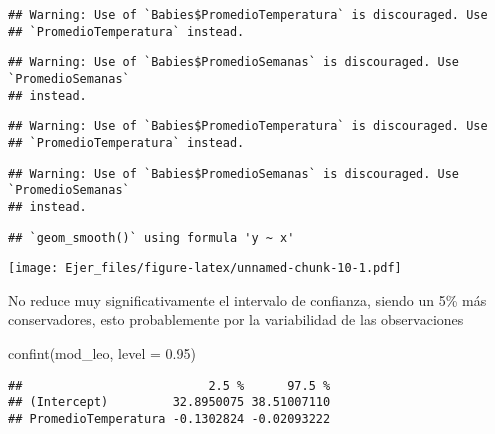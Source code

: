 \documentclass[
]{article}
\newenvironment{Shaded}{\begin{snugshade}}{\end{snugshade}}
\newcommand{\AttributeTok}[1]{\textcolor[rgb]{0.77,0.63,0.00}{#1}}
\newcommand{\CommentTok}[1]{\textcolor[rgb]{0.56,0.35,0.01}{\textit{#1}}}
\newcommand{\FloatTok}[1]{\textcolor[rgb]{0.00,0.00,0.81}{#1}}
\newcommand{\FunctionTok}[1]{\textcolor[rgb]{0.00,0.00,0.00}{#1}}
\newcommand{\NormalTok}[1]{#1}
\begin{document}
\begin{verbatim}
## Warning: Use of `Babies$PromedioTemperatura` is discouraged. Use
## `PromedioTemperatura` instead.
\end{verbatim}

\begin{verbatim}
## Warning: Use of `Babies$PromedioSemanas` is discouraged. Use `PromedioSemanas`
## instead.
\end{verbatim}

\begin{verbatim}
## Warning: Use of `Babies$PromedioTemperatura` is discouraged. Use
## `PromedioTemperatura` instead.
\end{verbatim}

\begin{verbatim}
## Warning: Use of `Babies$PromedioSemanas` is discouraged. Use `PromedioSemanas`
## instead.
\end{verbatim}

\begin{verbatim}
## `geom_smooth()` using formula 'y ~ x'
\end{verbatim}

\texttt{[image: Ejer\_files/figure-latex/unnamed-chunk-10-1.pdf]}

No reduce muy significativamente el intervalo de confianza, siendo un
5\% más conservadores, esto probablemente por la variabilidad de las
observaciones

\begin{Shaded}
\begin{Highlighting}[]
\FunctionTok{confint}\NormalTok{(mod\_leo, }\AttributeTok{level =} \FloatTok{0.95}\NormalTok{)}
\end{Highlighting}
\end{Shaded}

\begin{verbatim}
##                          2.5 %      97.5 %
## (Intercept)         32.8950075 38.51007110
## PromedioTemperatura -0.1302824 -0.02093222
\end{verbatim}

\begin{Shaded}
\end{Shaded}
\end{document}
